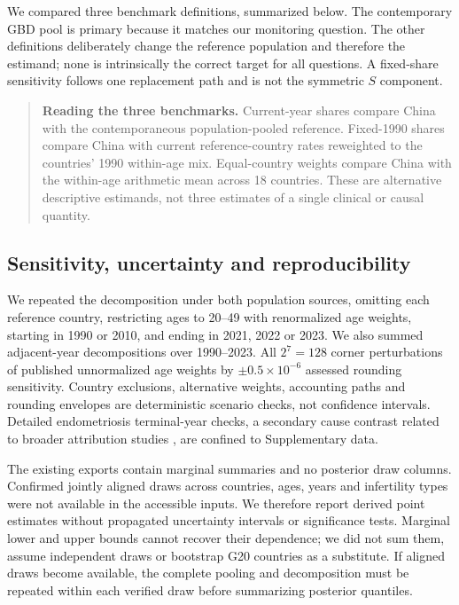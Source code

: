 \documentclass[11pt,a4paper]{article}
\begin{document}
We compared three benchmark definitions, summarized below. The contemporary GBD pool is primary because it matches our monitoring question. The other definitions deliberately change the reference population and therefore the estimand; none is intrinsically the correct target for all questions. A fixed-share sensitivity follows one replacement path and is not the symmetric $S$ component.

\begin{quote}\small{}
\textbf{Reading the three benchmarks.} Current-year shares compare China with the contemporaneous population-pooled reference. Fixed-1990 shares compare China with current reference-country rates reweighted to the countries' 1990 within-age mix. Equal-country weights compare China with the within-age arithmetic mean across 18 countries. These are alternative descriptive estimands, not three estimates of a single clinical or causal quantity.
\end{quote}

\subsection{Sensitivity, uncertainty and reproducibility}
We repeated the decomposition under both population sources, omitting each reference country, restricting ages to 20--49 with renormalized age weights, starting in 1990 or 2010, and ending in 2021, 2022 or 2023. We also summed adjacent-year decompositions over 1990--2023. All $2^7=128$ corner perturbations of published unnormalized age weights by $\pm0.5\times10^{-6}$ assessed rounding sensitivity. Country exclusions, alternative weights, accounting paths and rounding envelopes are deterministic scenario checks, not confidence intervals. Detailed endometriosis terminal-year checks, a secondary cause contrast related to broader attribution studies \citep{xu}, are confined to Supplementary data.

The existing exports contain marginal summaries and no posterior draw columns. Confirmed jointly aligned draws across countries, ages, years and infertility types were not available in the accessible inputs. We therefore report derived point estimates without propagated uncertainty intervals or significance tests. Marginal lower and upper bounds cannot recover their dependence; we did not sum them, assume independent draws or bootstrap G20 countries as a substitute. If aligned draws become available, the complete pooling and decomposition must be repeated within each verified draw before summarizing posterior quantiles.
\end{document}
